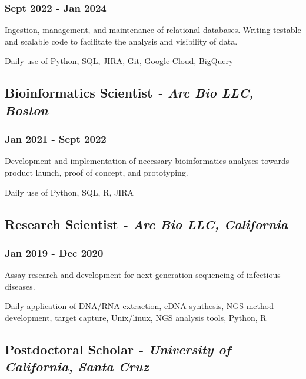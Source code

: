 \documentclass[11pt]{article}
\begin{document}
\subsubsection{Sept 2022 - Jan 2024}
\begin{description}[leftmargin=5pt]
    \item Ingestion, management, and maintenance of relational databases. Writing testable and scalable code to facilitate the analysis and visibility of data.
    \item Daily use of Python, SQL, JIRA, Git, Google Cloud, BigQuery
\end{description}
\bigskip


\subsection{Bioinformatics Scientist \normalfont\textit{- Arc Bio LLC, Boston}}
\subsubsection{Jan 2021 - Sept 2022}
\begin{description}[leftmargin=5pt]
    \item Development and implementation of necessary bioinformatics analyses towards product launch, proof of
concept, and prototyping.
    \item Daily use of Python, SQL, R, JIRA
\end{description}
\bigskip

\subsection{Research Scientist \normalfont\textit{- Arc Bio LLC, California}}
\subsubsection{Jan 2019 - Dec 2020}
\begin{description}[leftmargin=5pt]
    \item Assay research and development for next generation sequencing of infectious diseases.
    \item Daily application of DNA/RNA extraction, cDNA synthesis, NGS method development, target capture, Unix/linux, NGS analysis tools, Python, R
\end{description}
\bigskip

\subsection{Postdoctoral Scholar \normalfont\textit{- University of California, Santa Cruz}}
\end{document}
